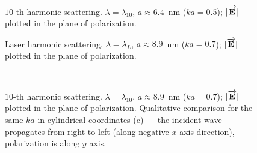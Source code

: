     \begin{figure}[H]
        \hfil
        \caption{$10$-th harmonic scattering. $\lambda = \lambda_{10}$, $a \approx 6.4$~nm ($ka = 0.5$); $|\overrightarrow{\textbf{E}_{}}|$ plotted in the plane of polarization.}
        \label{10h_ka0.5:image}
    \end{figure}

    \begin{figure}[H]
        \hfil
        \caption{Laser harmonic scattering. $\lambda = \lambda_{L}$, $a \approx 8.9$~nm ($ka = 0.7$); $|\overrightarrow{\textbf{E}_{}}|$ plotted in the plane of polarization.}
        \label{1h_ka0.7:image}
    \end{figure}

    \begin{figure}[H]
        \hfil
        \\
        \caption{$10$-th harmonic scattering. $\lambda = \lambda_{10}$, $a \approx 8.9$~nm ($ka = 0.7$); $|\overrightarrow{\textbf{E}_{}}|$ plotted in the plane of polarization. Qualitative comparison for the same $ka$ in cylindrical coordinates (c) --- the incident wave propagates from right to left (along negative $x$ axis direction), polarization is along $y$ axis.}
        \label{10h_ka0.7:image}
    \end{figure}


